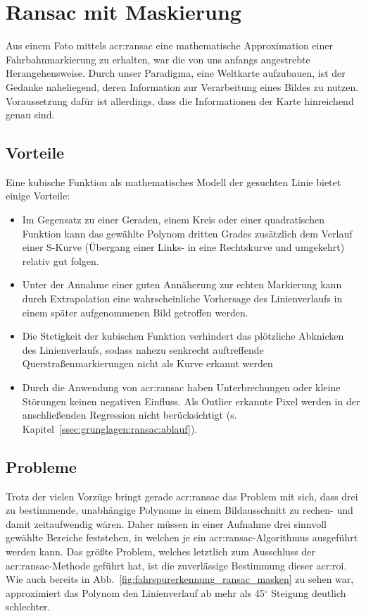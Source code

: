 \section{Ransac mit Maskierung \dcfirstauthorshort}

Aus einem Foto mittels \gls{acr:ransac} eine mathematische Approximation einer Fahrbahnmarkierung zu erhalten, war die von uns anfangs angestrebte Herangehensweise. Durch unser Paradigma, eine Weltkarte aufzubauen, ist der Gedanke naheliegend, deren Information zur Verarbeitung eines Bildes zu nutzen. Voraussetzung dafür ist allerdings, dass die Informationen der Karte hinreichend genau sind.

\subsection{Vorteile}
Eine kubische Funktion als mathematisches Modell der gesuchten Linie bietet einige Vorteile:
\begin{itemize}
\item Im Gegensatz zu einer Geraden, einem Kreis oder einer quadratischen Funktion kann das gewählte Polynom dritten Grades zusätzlich dem Verlauf einer S-Kurve (Übergang einer Links- in eine Rechtskurve und umgekehrt) relativ gut folgen. 
\item Unter der Annahme einer guten Annäherung zur echten Markierung kann durch Extrapolation eine wahrscheinliche Vorhersage des Linienverlaufs in einem später aufgenommenen Bild getroffen werden. 
\item Die Stetigkeit der kubischen Funktion verhindert das plötzliche Abknicken des Linienverlaufs, sodass nahezu senkrecht auftreffende Querstraßenmarkierungen nicht als Kurve erkannt werden
\item Durch die Anwendung von \gls{acr:ransac} haben Unterbrechungen oder kleine Störungen keinen negativen Einfluss. Als Outlier erkannte Pixel werden in der anschließenden Regression nicht berücksichtigt (s. Kapitel~\ref{ssec:grunglagen:ransac:ablauf}).
\end{itemize}

\subsection{Probleme}
\label{ssec:evaluation:ransac:probleme}
Trotz der vielen Vorzüge bringt gerade \gls{acr:ransac} das Problem mit sich, dass drei zu bestimmende, unabhängige Polynome in einem Bildausschnitt zu rechen- und damit zeitaufwendig wären. Daher müssen in einer Aufnahme drei sinnvoll gewählte Bereiche feststehen, in welchen je ein \gls{acr:ransac}-Algorithmus ausgeführt werden kann. 
Das größte Problem, welches letztlich zum Ausschluss der \gls{acr:ransac}-Methode geführt hat, ist die zuverlässige Bestimmung dieser \gls{acr:roi}. Wie auch bereits in Abb.~\ref{fig:fahrspurerkennung_ransac_masken} zu sehen war, approximiert das Polynom den Linienverlauf ab mehr als 45\(^\circ\) Steigung deutlich schlechter. 

